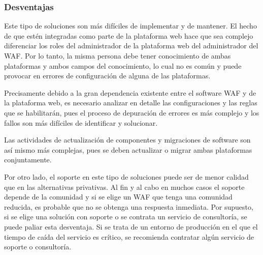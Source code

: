 \subsubsection{Desventajas}
\par Este tipo de soluciones son más difíciles de implementar y de mantener. El hecho de que estén integradas como parte de la plataforma web
hace que sea complejo diferenciar los roles del administrador de la plataforma web del administrador del WAF. Por lo tanto, la misma persona
debe tener conocimiento de ambas plataformas y ambos campos del conocimiento, lo cual no es común y puede provocar en errores de configuración
de alguna de las plataformas.
\par Precisamente debido a la gran dependencia existente entre el software WAF y de la plataforma web, es necesario analizar en detalle las
configuraciones y las reglas que se habilitarán, pues el proceso de depuración de errores es más complejo y los fallos son más difíciles de
identificar y solucionar.
\par Las actividades de actualización de componentes y migraciones de software son así mismo más complejas, pues se deben actualizar o migrar
ambas plataformas conjuntamente.
\par Por otro lado, el soporte en este tipo de soluciones puede ser de menor calidad que en las alternativas privativas. Al fin y al cabo en
muchos casos el soporte depende de la comunidad y si se elige un WAF que tenga una comunidad reducida, es probable que no se obtenga una
respuesta inmediata. Por supuesto, si se elige una solución con soporte o se contrata un servicio de consultoría, se puede paliar esta
desventaja. Si se trata de un entorno de producción en el que el tiempo de caída del servicio es crítico, se recomienda contratar algún
servicio de soporte o consultoría.


